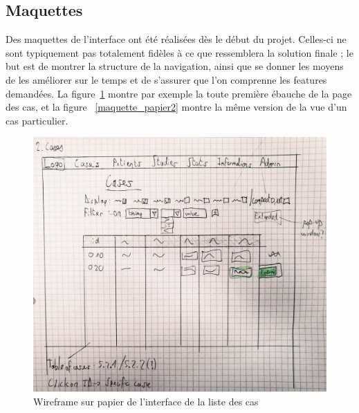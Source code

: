 	\subsection{Maquettes}

		Des maquettes de l'interface ont été réalisées dès le début du projet. Celles-ci ne sont typiquement pas totalement fidèles à ce que ressemblera la solution finale ; le but est de montrer la structure de la navigation, ainsi que se donner les moyens de les améliorer sur le temps et de s'assurer que l'on comprenne les features demandées. La figure~\ref{maquette_papier} montre par exemple la toute première ébauche de la page des cas, et la figure ~\ref{maquette_papier2} montre la même version de la vue d'un cas particulier.

		\begin{figure}[!h]
			\centering
			\includegraphics[width=1\textwidth]{images/analyse/maquette1}
			\caption{Wireframe sur papier de l'interface de la liste des cas}
			\label{maquette_papier}
		\end{figure}

